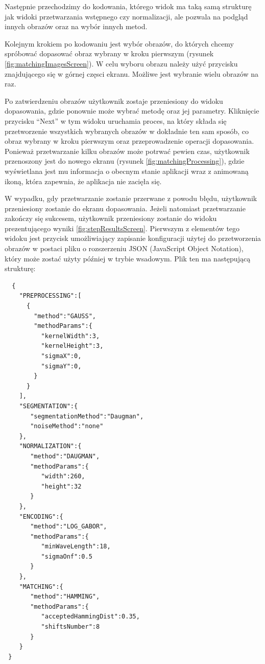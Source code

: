 Następnie przechodzimy do kodowania, którego widok ma taką samą strukturę jak widoki przetwarzania
wstępnego czy normalizacji, ale pozwala na podgląd innych obrazów oraz na wybór innych metod.\newline

Kolejnym krokiem po kodowaniu jest wybór obrazów, do których chcemy spróbowa\'c dopasowa\'c obraz
wybrany w kroku pierwszym (rysunek \ref{fig:matchingImagesScreen}). W celu wyboru obrazu należy
uży\'c przycisku znajdującego się w górnej częsci ekranu. Możliwe jest wybranie wielu obrazów na raz.\newline

Po zatwierdzeniu obrazów użytkownik zostaje przeniesiony do widoku dopasowania, gdzie ponownie
może wybra\'c metodę oraz jej parametry. Kliknięcie przycisku ``Next'' w tym widoku
uruchamia proces, na który składa się przetworzenie wszystkich wybranych obrazów w dokładnie
ten sam sposób, co obraz wybrany w kroku pierwszym oraz przeprowadzenie operacji dopasowania.
Ponieważ przetwarzanie kilku obrazów może potrwa\'c pewien czas, użytkownik przenoszony jest do
nowego ekranu (rysunek \ref{fig:matchingProcessing}), gdzie wyświetlana jest mu informacja o obecnym
stanie aplikacji wraz z animowaną ikoną, która zapewnia, że aplikacja nie zacięła się.

W wypadku, gdy przetwarzanie zostanie przerwane z powodu błędu, użytkownik przeniesiony zostanie do ekranu
dopasowania. Jeżeli natomiast przetwarzanie zakończy się sukcesem, użytkownik przeniesiony zostanie
do widoku prezentującego wyniki \ref{fig:stepResultsScreen}. Pierwszym z elementów tego widoku
jest przycisk umożliwiający zapisanie konfiguracji użytej do przetworzenia obrazów w postaci pliku
o rozszerzeniu JSON (JavaScript Object Notation), który może zosta\'c użyty pó\'zniej w trybie
wsadowym. Plik ten ma następującą strukturę:

\begin{verbatim}
  {
    "PREPROCESSING":[
      {
        "method":"GAUSS",
        "methodParams":{
          "kernelWidth":3,
          "kernelHeight":3,
          "sigmaX":0,
          "sigmaY":0,
        }
      }
    ],
    "SEGMENTATION":{
       "segmentationMethod":"Daugman",
       "noiseMethod":"none"
    },
    "NORMALIZATION":{
       "method":"DAUGMAN",
       "methodParams":{
          "width":260,
          "height":32
       }
    },
    "ENCODING":{
       "method":"LOG_GABOR",
       "methodParams":{
          "minWaveLength":18,
          "sigmaOnf":0.5
       }
    },
    "MATCHING":{
       "method":"HAMMING",
       "methodParams":{
          "acceptedHammingDist":0.35,
          "shiftsNumber":8
       }
    }
 }
\end{verbatim}

